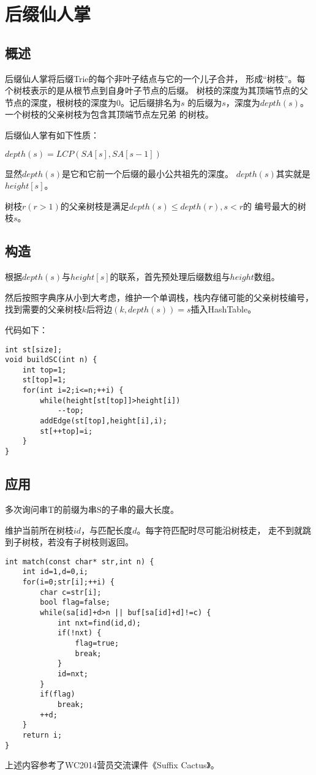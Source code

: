 \section{后缀仙人掌}
\subsection{概述}
后缀仙人掌将后缀Trie的每个非叶子结点与它的一个儿子合并，
形成``树枝''。每个树枝表示的是从根节点到自身叶子节点的后缀。
树枝的深度为其顶端节点的父节点的深度，根树枝的深度为0。记后缀排名为$s$
的后缀为$s$，深度为$depth(s)$。一个树枝的父亲树枝为包含其顶端节点左兄弟
的树枝。

后缀仙人掌有如下性质：
\begin{property}
	$depth(s)=LCP(SA[s],SA[s-1])$
\end{property}
显然$depth(s)$是它和它前一个后缀的最小公共祖先的深度。
$depth(s)$其实就是$height[s]$。
\begin{property}
	树枝$r(r>1)$的父亲树枝是满足$depth(s)\leq depth(r),s<r$的
	编号最大的树枝$s$。
\end{property}
\subsection{构造}
根据$depth(s)$与$height[s]$的联系，首先预处理后缀数组与$height$数组。

然后按照字典序从小到大考虑，维护一个单调栈，栈内存储可能的父亲树枝编号，
找到需要的父亲树枝$k$后将边$(k,depth(s))=s$插入HashTable。

代码如下：
\begin{lstlisting}
int st[size];
void buildSC(int n) {
    int top=1;
    st[top]=1;
    for(int i=2;i<=n;++i) {
        while(height[st[top]]>height[i])
            --top;
        addEdge(st[top],height[i],i);
        st[++top]=i;
    }
}
\end{lstlisting}
\subsection{应用}
多次询问串T的前缀为串S的子串的最大长度。

维护当前所在树枝$id$，与匹配长度$d$。每字符匹配时尽可能沿树枝走，
走不到就跳到子树枝，若没有子树枝则返回。
\begin{lstlisting}
int match(const char* str,int n) {
    int id=1,d=0,i;
    for(i=0;str[i];++i) {
        char c=str[i];
        bool flag=false;
        while(sa[id]+d>n || buf[sa[id]+d]!=c) {
            int nxt=find(id,d);
            if(!nxt) {
                flag=true;
                break;
            }
            id=nxt;
        }
        if(flag)
            break;
        ++d;
    }
    return i;
}
\end{lstlisting}
上述内容参考了WC2014营员交流课件《Suffix Cactus》。
